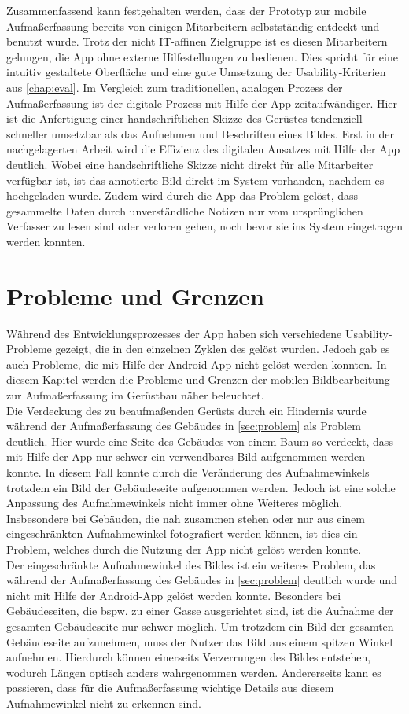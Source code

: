 Zusammenfassend kann festgehalten werden, dass der Prototyp zur mobile Aufmaßerfassung bereits von einigen Mitarbeitern selbstständig entdeckt und benutzt wurde.
Trotz der nicht IT-affinen Zielgruppe ist es diesen Mitarbeitern gelungen, die App ohne externe Hilfestellungen zu bedienen.
Dies spricht für eine intuitiv gestaltete Oberfläche und eine gute Umsetzung der Usability-Kriterien aus \autoref{chap:eval}.
Im Vergleich zum traditionellen, analogen Prozess der Aufmaßerfassung ist der digitale Prozess mit Hilfe der App zeitaufwändiger.
Hier ist die Anfertigung einer handschriftlichen Skizze des Gerüstes tendenziell schneller umsetzbar als das Aufnehmen und Beschriften eines Bildes.
Erst in der nachgelagerten Arbeit wird die Effizienz des digitalen Ansatzes mit Hilfe der App deutlich.
Wobei eine handschriftliche Skizze nicht direkt für alle Mitarbeiter verfügbar ist, ist das annotierte Bild direkt im System vorhanden, nachdem es hochgeladen wurde.
Zudem wird durch die App das Problem gelöst, dass gesammelte Daten durch unverständliche Notizen nur vom ursprünglichen Verfasser zu lesen sind oder verloren gehen, noch bevor sie ins System eingetragen werden konnten.

\section{Probleme und Grenzen}
Während des Entwicklungsprozesses der App haben sich verschiedene Usability-Probleme gezeigt, die in den einzelnen Zyklen des \hcdp{} gelöst wurden.
Jedoch gab es auch Probleme, die mit Hilfe der Android-App nicht gelöst werden konnten.
In diesem Kapitel werden die Probleme und Grenzen der mobilen Bildbearbeitung zur Aufmaßerfassung im Gerüstbau näher beleuchtet. \\

Die Verdeckung des zu beaufmaßenden Gerüsts durch ein Hindernis wurde während der Aufmaßerfassung des Gebäudes in \autoref{sec:problem} als Problem deutlich.
Hier wurde eine Seite des Gebäudes von einem Baum so verdeckt, dass mit Hilfe der App nur schwer ein verwendbares Bild aufgenommen werden konnte.
In diesem Fall konnte durch die Veränderung des Aufnahmewinkels trotzdem ein Bild der Gebäudeseite aufgenommen werden.
Jedoch ist eine solche Anpassung des Aufnahmewinkels nicht immer ohne Weiteres möglich.
Insbesondere bei Gebäuden, die nah zusammen stehen oder nur aus einem eingeschränkten Aufnahmewinkel fotografiert werden können, ist dies ein Problem, welches durch die Nutzung der App nicht gelöst werden konnte. \\

Der eingeschränkte Aufnahmewinkel des Bildes ist ein weiteres Problem, das während der Aufmaßerfassung des Gebäudes in \autoref{sec:problem} deutlich wurde und nicht mit Hilfe der Android-App gelöst werden konnte.
Besonders bei Gebäudeseiten, die bspw. zu einer Gasse ausgerichtet sind, ist die Aufnahme der gesamten Gebäudeseite nur schwer möglich.
Um trotzdem ein Bild der gesamten Gebäudeseite aufzunehmen, muss der Nutzer das Bild aus einem spitzen Winkel aufnehmen.
Hierdurch können einerseits Verzerrungen des Bildes entstehen, wodurch Längen optisch anders wahrgenommen werden.
Andererseits kann es passieren, dass für die Aufmaßerfassung wichtige Details aus diesem Aufnahmewinkel nicht zu erkennen sind.
